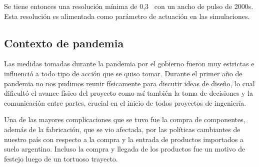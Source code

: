 Se tiene entonces una resolución mínima de 0,3\grad~ con un ancho de pulso de 2000\micro s. Esta resolución es alimentada como parámetro de actuación en las simulaciones.


\subsection{Contexto de pandemia}
Las medidas tomadas durante la pandemia por el gobierno fueron muy estrictas e influenció a todo tipo de acción que se quiso tomar. Durante el primer año de pandemia no nos pudimos reunir físicamente para discutir ideas de diseño, lo cual dificultó el avance físico del proyecto como así también la toma de decisiones y la comunicación entre partes, crucial en el inicio de todos proyectos de ingeniería.

\medskip

Una de las mayores complicaciones que se tuvo fue la compra de
componentes, además de la fabricación, que se vio afectada, por las políticas cambiantes de
nuestro país con respecto a la compra y la entrada de productos importados a suelo argentino.
Incluso la compra y llegada de los productos fue un motivo de festejo luego de un tortuoso
trayecto.



